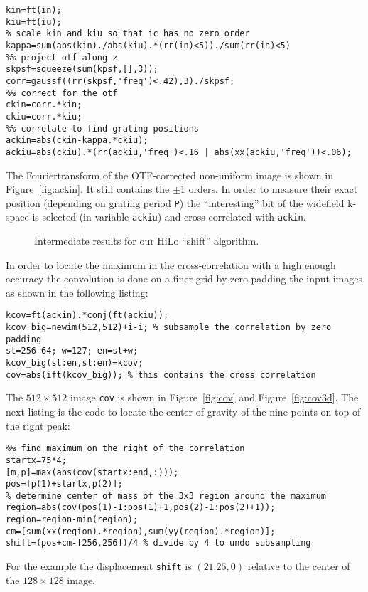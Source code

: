 \documentclass[11pt]{scrartcl}
\newcommand{\figref}[1]{Figure~\ref{#1}}
\begin{document}
\begin{lstlisting}
kin=ft(in);
kiu=ft(iu);
% scale kin and kiu so that ic has no zero order
kappa=sum(abs(kin)./abs(kiu).*(rr(in)<5))./sum(rr(in)<5)
%% project otf along z
skpsf=squeeze(sum(kpsf,[],3));
corr=gaussf((rr(skpsf,'freq')<.42),3)./skpsf;
%% correct for the otf
ckin=corr.*kin;
ckiu=corr.*kiu;
%% correlate to find grating positions
ackin=abs(ckin-kappa.*ckiu);
ackiu=abs(ckiu).*(rr(ackiu,'freq')<.16 | abs(xx(ackiu,'freq'))<.06);
\end{lstlisting}
The Fouriertransform of the OTF-corrected non-uniform image is shown
in \figref{fig:ackin}. It still contains the $\pm1$ orders. In order
to measure their exact position (depending on grating period {\tt P})
the ``interesting'' bit of the widefield k-space is selected (in
variable {\tt ackiu}) and cross-correlated with {\tt ackin}.

\begin{figure}[htb]
  \centering {}
  \caption{Intermediate results for our HiLo ``shift'' algorithm.}
  \label{fig:hilo3}
\end{figure}

In order to locate the maximum in the cross-correlation with a high
enough accuracy the convolution is done on a finer grid by
zero-padding the input images as shown in the following listing: 
\begin{lstlisting}
kcov=ft(ackin).*conj(ft(ackiu));
kcov_big=newim(512,512)+i-i; % subsample the correlation by zero padding
st=256-64; w=127; en=st+w;
kcov_big(st:en,st:en)=kcov;
cov=abs(ift(kcov_big)); % this contains the cross correlation
\end{lstlisting}
The $512\times512$ image {\tt cov} is shown in \figref{fig:cov} and
\figref{fig:cov3d}. The next listing is the code to locate the center of gravity of the nine points on top of the right peak:
\begin{lstlisting}
%% find maximum on the right of the correlation
startx=75*4;
[m,p]=max(abs(cov(startx:end,:)));
pos=[p(1)+startx,p(2)];
% determine center of mass of the 3x3 region around the maximum
region=abs(cov(pos(1)-1:pos(1)+1,pos(2)-1:pos(2)+1));
region=region-min(region);
cm=[sum(xx(region).*region),sum(yy(region).*region)];
shift=(pos+cm-[256,256])/4 % divide by 4 to undo subsampling
\end{lstlisting}
For the example the displacement {\tt shift} is $(21.25,0)$ relative
to the center of the $128\times128$ image.
\end{document}
